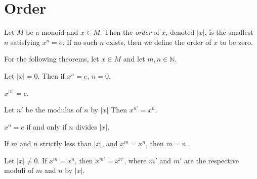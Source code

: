 \section{Order}

\begin{definition}
    \label{definition : order}
    \leanok
    Let $M$ be a monoid and $x \in M$. Then the \textit{order} of $x$, denoted $|x|$, is the smallest $n$ satisfying $x^n = e$. If no such $n$ exists, then we define the order of $x$ to be zero.
\end{definition}

For the following theorems, let $x \in M$ and let $m,n \in \mathbb{N}$.

\begin{theorem}
    \label{theorem : mpow_order_zero}
    \leanok
    Let $|x| = 0$. Then if $x^n = e$, $n = 0$.
\end{theorem}

\begin{theorem}
    \label{theorem : mpow_order}
    \leanok
    $x^{|x|} = e$.
\end{theorem}

\begin{theorem}
    \label{theorem : mpow_mod_order}
    \leanok
    Let $n'$ be the modulus of $n$ by $|x|$ Then $x^{n'} = x^n$.
\end{theorem}

\begin{theorem}
    \label{theorem : order_divides_iff_mpow_id}
    \leanok
    $x^n = e$ if and only if $n$ divides $|x|$.
\end{theorem}

\begin{lemma}
    \label{theorem : mpow_inj_of_lt_order}
    \leanok
    If $m$ and $n$ strictly less than $|x|$, and $x^m = x^n$, then $m = n$.
\end{lemma}

\begin{theorem}
    \label{theorem : mod_order_eq_of_mpow_eq}
    \leanok
    Let $|x| \ne 0$. If $x^m = x^n$, then $x^{m'} = x^{n'}$, where $m'$ and $m'$ are the respective moduli of $m$ and $n$ by $|x|$.
\end{theorem}

